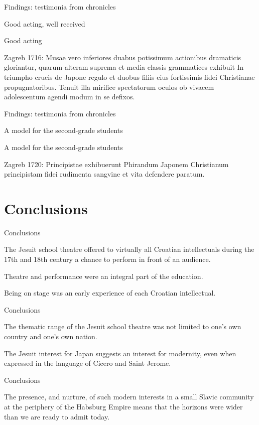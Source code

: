 \documentclass[14pt]{beamer}
\begin{document}
\begin{frame}{Findings: testimonia from chronicles}

Good acting, well received


\end{frame}

\begin{frame}{Good acting}

\alert{Zagreb 1716}: Musae vero inferiores duabus potissimum actionibus dramaticis gloriantur, quarum alteram suprema et media classis grammatices exhibuit In triumpho crucis de Japone regulo et duobus filiis eius fortissimis fidei Christianae propugnatoribus. Tenuit illa mirifice spectatorum oculos ob vivacem adolescentum agendi modum in se defixos.

\end{frame}

\begin{frame}{Findings: testimonia from chronicles}

A model for the second-grade students

\end{frame}

\begin{frame}{A model for the second-grade students}

\alert{Zagreb 1720}: Principistae exhibuerunt Phirandum Japonem Christianum principistam fidei rudimenta sangvine et vita defendere paratum.

\end{frame}

\section{Conclusions}

\begin{frame}{Conclusions}

The Jesuit school theatre offered to virtually all Croatian intellectuals during the 17th and 18th century a chance to perform in front of an audience. 

Theatre and performance were an integral part of the education.

Being on stage was an early experience of each Croatian intellectual.


\end{frame}

\begin{frame}{Conclusions}

The thematic range of the Jesuit school theatre was not limited to one's own country and one's own nation. 

The Jesuit interest for Japan suggests an interest for modernity, even when expressed in the language of Cicero and Saint Jerome. 




\end{frame}

\begin{frame}{Conclusions}

The presence, and nurture, of such modern interests in a small Slavic community at the periphery of the Habsburg Empire means that the horizons were wider than we are ready to admit today.

\end{frame}



  \maketitle
\end{document}
